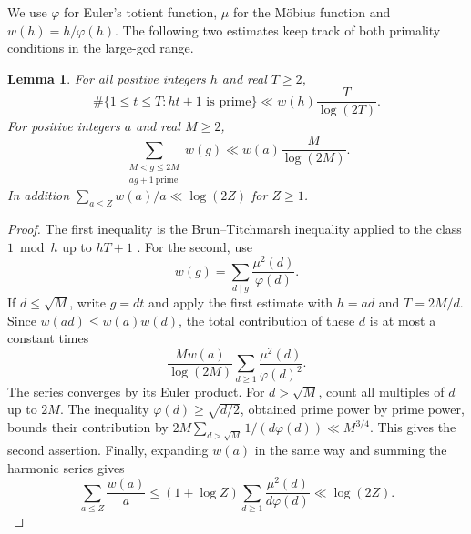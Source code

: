 \documentclass[11pt]{article}
\newtheorem{lemma}[theorem]{Lemma}
\begin{document}
We use \(\varphi\) for Euler's totient function, \(\mu\) for the
M\"obius function and \(w(h)=h/\varphi(h)\).
The following two estimates keep track of both primality conditions
in the large-gcd range.

\begin{lemma}\label{lem:BT}
For all positive integers \(h\) and real \(T\ge2\),
\[
 \#\{1\le t\le T: ht+1\text{ is prime}\}
       \ll w(h)\frac{T}{\log(2T)}.
\]
For positive integers \(a\) and real \(M\ge2\),
\[
 \sum_{\substack{M<g\le2M\\ ag+1\ \mathrm{prime}}}w(g)
        \ll w(a)\frac{M}{\log(2M)}.
\]
In addition \(\sum_{a\le Z} w(a)/a\ll\log(2Z)\) for \(Z\ge1\).
\end{lemma}

\begin{proof}
The first inequality is the Brun--Titchmarsh inequality applied
to the class \(1\bmod h\) up to \(hT+1\) \cite[Theorem~2, (1.10)]{MV}.
For the second, use
\[
            w(g)=\sum_{d\mid g}\frac{\mu^2(d)}{\varphi(d)}.
\]
If \(d\le\sqrt M\), write \(g=dt\) and apply the first estimate
with \(h=ad\) and \(T=2M/d\). Since \(w(ad)\le w(a)w(d)\),
the total contribution of these \(d\) is at most a constant times
\[
 \frac{M w(a)}{\log(2M)}
      \sum_{d\ge1}\frac{\mu^2(d)}{\varphi(d)^2}.
\]
The series converges by its Euler product. For \(d>\sqrt M\),
count all multiples of \(d\) up to \(2M\). The inequality
\(\varphi(d)\ge\sqrt{d/2}\), obtained prime power by prime power,
bounds their contribution by
\(2M\sum_{d>\sqrt M}1/(d\varphi(d))\ll M^{3/4}\).
This gives the second assertion. Finally, expanding \(w(a)\) in the
same way and summing the harmonic series gives
\[
  \sum_{a\le Z}\frac{w(a)}{a}
       \le (1+\log Z)\sum_{d\ge1}\frac{\mu^2(d)}{d\varphi(d)}
       \ll\log(2Z).
\]
\end{proof}
\end{document}
